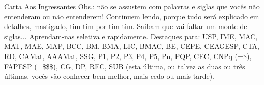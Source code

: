 \begin{editorial}{Carta Aos Ingressantes}
Obs.: não se assustem com palavras e siglas que vocês não entenderam ou 
não entenderem! Continuem lendo, porque tudo será explicado em detalhes, 
mastigado, tim-tim por tim-tim. Saibam que vai faltar um monte de siglas...  
Aprendam-nas seletiva e rapidamente. Destaques para: USP, IME, MAC,
MAT, MAE, MAP, BCC, BM, BMA, LIC, BMAC, BE, CEPE, CEAGESP, CTA, RD, CAMat,
AAAMat, SSG, P1, P2, P3, P4, P5, Pn, PQP, CEC, CNPq (=\$), FAPESP
(=\$\$\$), CG, DP, REC, SUB (esta última, ou talvez as duas ou três últimas,
vocês vão conhecer bem melhor, mais cedo ou mais tarde).

\end{editorial}
